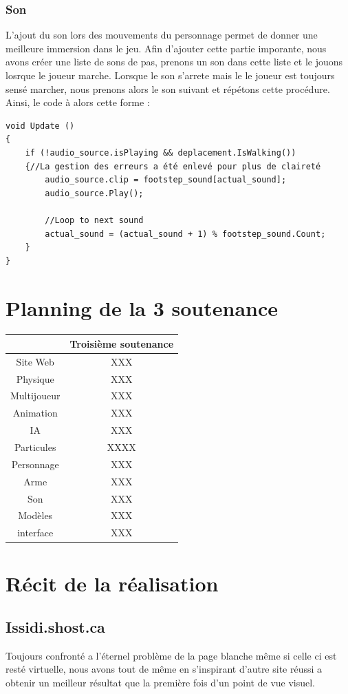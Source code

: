 ﻿\documentclass[12pt]{article}
\begin{document}
\subsubsection {Son}
L'ajout du son lors des mouvements du personnage permet de donner une meilleure immersion dans le jeu.
Afin d'ajouter cette partie imporante, nous avons créer une liste de sons de pas, prenons un son dans cette liste et le jouons
losrque le joueur marche. Lorsque le son s'arrete mais le le joueur est toujours sensé marcher, nous prenons alors le son suivant
et répétons cette procédure. Ainsi, le code à alors cette forme :
\begin {verbatim}
void Update ()
{
    if (!audio_source.isPlaying && deplacement.IsWalking())
    {//La gestion des erreurs a été enlevé pour plus de claireté
        audio_source.clip = footstep_sound[actual_sound];
        audio_source.Play();

        //Loop to next sound
        actual_sound = (actual_sound + 1) %
    }
}
\end{verbatim}
	
\section{Planning de la 3\ieme{} soutenance}
\begin{tabular}{|c|c|}
\hline
			& Troisième soutenance\\ \hline
Site Web	& XXX	\\ \hline
Physique	& XXX	\\ \hline
Multijoueur	& XXX	\\ \hline
Animation	& XXX	\\ \hline
IA	        & XXX	\\ \hline
Particules	& XXXX	\\ \hline
Personnage	& XXX	\\ \hline
Arme		& XXX	\\ \hline
Son			& XXX	\\ \hline
Modèles		& XXX	\\ \hline
interface	& XXX	\\ \hline
\end{tabular}

\section{Récit de la réalisation}
\subsection{Issidi.shost.ca}
Toujours confronté a l'éternel problème de la page blanche même si celle ci est resté virtuelle, nous avons tout de même en s'inspirant d'autre site réussi a obtenir un meilleur résultat que la première fois d'un point de vue visuel.
 
\end{document}
